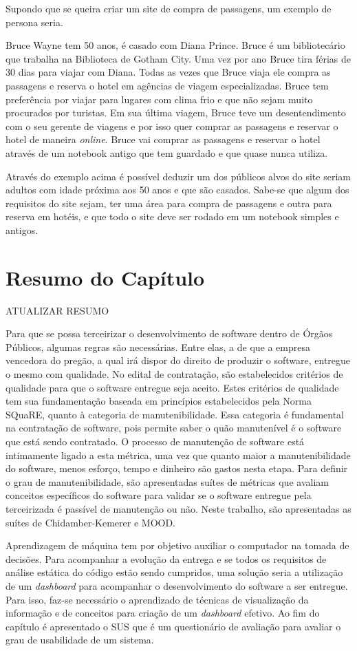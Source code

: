 Supondo que se queira criar um site de compra de passagens, um exemplo de persona seria. 

Bruce Wayne tem 50 anos, é casado com Diana Prince. Bruce é  um bibliotecário que trabalha na Biblioteca de Gotham City. Uma vez por ano Bruce tira férias de 30 dias para viajar com Diana. Todas as vezes que Bruce viaja ele compra as passagens e reserva o hotel em agências de viagem especializadas. Bruce tem preferência por viajar para lugares com clima frio e que não sejam muito procurados por turistas. Em sua última viagem, Bruce teve um desentendimento com o seu gerente de viagens e por isso quer comprar as passagens e reservar o hotel de maneira \textit{online}. Bruce vai comprar as passagens e reservar o hotel através de um notebook antigo que tem guardado e que quase nunca utiliza.

Através do exemplo acima é possível deduzir um dos públicos alvos do site seriam adultos com idade próxima aos 50 anos e que são casados. Sabe-se que algum dos requisitos do site sejam, ter uma área para compra de passagens e outra para reserva em hotéis, e que todo o site deve ser rodado em um notebook simples e antigos.


\section{Resumo do Capítulo}
ATUALIZAR RESUMO 


Para que se possa terceirizar o desenvolvimento de software dentro de Órgãos Públicos, algumas regras são necessárias. Entre elas, a de que a empresa vencedora do pregão, a qual irá dispor do direito de produzir o software, entregue o mesmo com qualidade. No edital de contratação, são estabelecidos critérios de qualidade para que o software entregue seja aceito. Estes critérios de qualidade tem sua fundamentação baseada em princípios estabelecidos pela Norma SQuaRE, quanto à categoria de manutenibilidade. Essa categoria é fundamental na contratação de software, pois permite saber o quão manutenível é o software que está sendo contratado. O processo de manutenção de software está intimamente ligado a esta métrica, uma vez que quanto maior a manutenibilidade do software, menos esforço, tempo e dinheiro são gastos nesta etapa. Para definir o grau de manutenibilidade, são apresentadas suítes de métricas que avaliam conceitos específicos do software para validar se o software entregue pela terceirizada é passível de manutenção ou não. Neste trabalho, são apresentadas as suítes de Chidamber-Kemerer e MOOD. 

Aprendizagem de máquina tem por objetivo auxiliar o computador na tomada de decisões. Para acompanhar a evolução da entrega e se todos os requisitos de análise estática do código estão sendo cumpridos, uma solução seria a utilização de um \textit{dashboard} para acompanhar o desenvolvimento do software a ser entregue. Para isso, faz-se necessário o aprendizado de técnicas de visualização da informação e de conceitos para criação de um \textit{dashboard} efetivo. Ao fim do capítulo é apresentado o SUS que é um questionário de avaliação para avaliar o grau de usabilidade de um sistema.